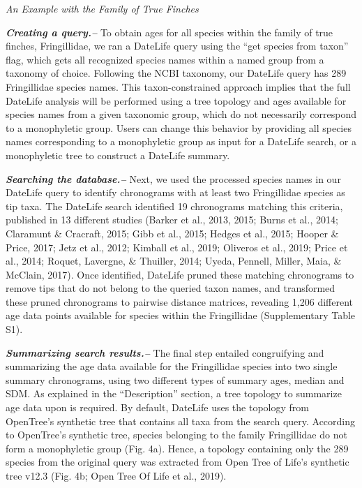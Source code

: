 \documentclass[english,man]{apa6}
\begin{document}
\newpage

\begin{center}
\emph{An Example with the Family of True Finches}
\end{center}

\textbf{\emph{Creating a query.--}}
To obtain ages for all species within the family of true finches, Fringillidae, we ran a DateLife query using the \enquote{get species from taxon} flag,
which gets all recognized species names within a named group from a taxonomy of choice.
Following the NCBI taxonomy, our DateLife query has 289 Fringillidae species names.
This taxon-constrained approach implies that the full DateLife analysis will be performed using a tree topology and ages available for species names from a given taxonomic group, which do not necessarily correspond to a monophyletic group. Users can change this behavior by providing all species names corresponding to a monophyletic group as input for a DateLife search, or a monophyletic tree to construct a DateLife summary.

\textbf{\emph{Searching the database.--}}
Next, we used the processed species names in our DateLife query to identify chronograms with at least two Fringillidae species as tip taxa.
The DateLife search identified 19 chronograms matching this criteria, published in 13 different studies (Barker et al., 2013, 2015; Burns et al., 2014; Claramunt \& Cracraft, 2015; Gibb et al., 2015; Hedges et al., 2015; Hooper \& Price, 2017; Jetz et al., 2012; Kimball et al., 2019; Oliveros et al., 2019; Price et al., 2014; Roquet, Lavergne, \& Thuiller, 2014; Uyeda, Pennell, Miller, Maia, \& McClain, 2017).
Once identified, DateLife pruned these matching chronograms to remove tips that do not belong to the queried taxon names, and transformed these pruned chronograms to pairwise distance matrices, revealing 1,206 different age data points available for species within the Fringillidae (Supplementary Table S1).

\textbf{\emph{Summarizing search results.--}}
The final step entailed congruifying and summarizing the age data available for the Fringillidae species into two single summary chronograms, using two different types of summary ages, median and SDM.
As explained in the \enquote{Description} section, a tree topology to summarize age data upon is required.
By default, DateLife uses the topology from OpenTree's synthetic tree that contains all taxa from the search query.
According to OpenTree's synthetic tree, species belonging to the family Fringillidae do not form a monophyletic group (Fig. 4a). Hence, a topology containing only the 289 species from the original query was extracted from Open Tree of Life's synthetic tree v12.3 (Fig. 4b; Open Tree Of Life et al., 2019).
\end{document}
